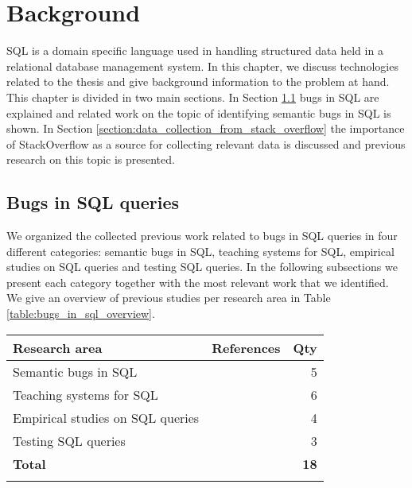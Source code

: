\chapter{Background}
\label{chapter:background}

SQL is a domain specific language used in handling structured data held in a relational database management system. In this chapter, we discuss technologies related to the thesis and give background information to the problem at hand. This chapter is divided in two main sections. In Section \ref{section:sql_bugs} bugs in SQL are explained and related work on the topic of identifying semantic bugs in SQL is shown. In Section \ref{section:data_collection_from_stack_overflow} the importance of StackOverflow as a source for collecting relevant data is discussed and previous research on this topic is presented.

\section{Bugs in SQL queries}
\label{section:sql_bugs}
We organized the collected previous work related to bugs in SQL queries in four different categories: semantic bugs in SQL, teaching systems for SQL, empirical studies on SQL queries and testing SQL queries. In the following subsections we present each category together with the most relevant work that we identified. We give an overview of previous studies per research area in Table \ref{table:bugs_in_sql_overview}.

\begin{center}
\begin{tabularx}{\linewidth}{lXXr}
\toprule
\textbf{Research area} & \multicolumn{2}{X}{\textbf{References}} & \textbf{Qty} \\ \midrule
Semantic bugs in SQL & \multicolumn{2}{X}{\cite{P001} \cite{P002} \cite{P016} \cite{P019} \cite{P998}} & 5 \\
Teaching systems for SQL & \multicolumn{2}{X}{\cite{P004} \cite{P037} \cite{P005} \cite{P006} \cite{P017} \cite{P036}} & 6 \\
Empirical studies on SQL queries & \multicolumn{2}{X}{\cite{P008} \cite{P009} \cite{P010} \cite{P015}} & 4 \\
Testing SQL queries & \multicolumn{2}{X}{\cite{P011} \cite{P013} \cite{P014}} & 3 \\ \midrule
\textbf{Total} &  &  & \textbf{18} \\ \bottomrule
\caption{Literature collection related to bugs in SQL queries}
\label{table:bugs_in_sql_overview}
\end{tabularx}
\end{center}


